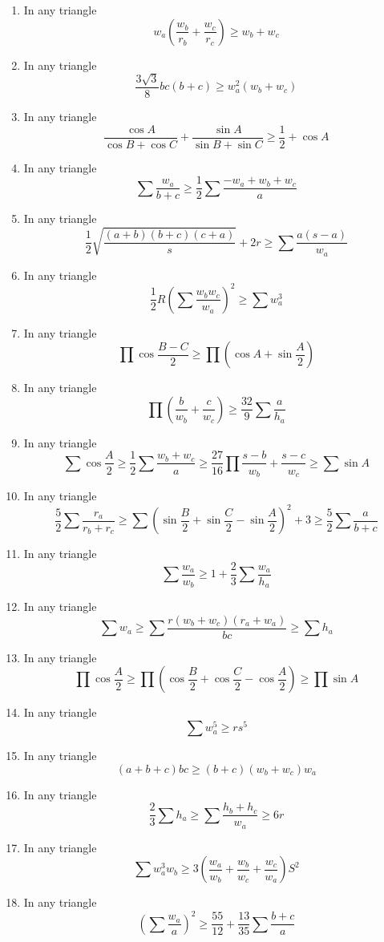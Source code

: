 \documentclass{report}
\begin{document}
\begin{enumerate}
	\item In any triangle$$w_a\left( \frac {w_b}{r_b} + \frac {w_c}{r_c}\right)\geq w_b + w_c$$
	\item In any triangle$$\frac{3\sqrt{3}}{8}bc(b+c)\geq w_a^2(w_b+w_c)$$
	\item In any triangle$$\frac {\cos{A}}{\cos{B} + \cos{C}} + \frac {\sin{A}}{\sin{B} + \sin{C}}\geq \frac {1}{2} + \cos{A}$$
	\item In any triangle$$\sum\frac{w_a}{b+c}\geq \frac{1}{2}\sum\frac{-w_a+w_b+w_c}{a}$$
	\item In any triangle$$\frac{1}{2}\sqrt {\frac {(a + b)(b + c)(c + a)}{s}} + 2r \geq \sum{\frac {a(s - a)}{w_a}}$$
	\item In any triangle$$\frac {1}{2}R\left( \sum\frac {w_bw_c}{w_a}\right) ^2\geq\sum{w_a^3}$$
	\item In any triangle$$\prod\cos\frac {B - C}{2}\geq \prod{\left( \cos{A} + \sin\frac {A}{2}\right) }$$
	\item In any triangle$$\prod{\left( \frac {b}{w_b} + \frac {c}{w_c}\right) }\geq \frac {32}{9}\sum\frac {a}{h_a}$$
	\item In any triangle$$\sum\cos\frac {A}{2}\geq \frac {1}{2}\sum\frac {w_b + w_c}{a}\geq \frac {27}{16}\prod{\frac {s - b}{w_b} + \frac {s - c}{w_c}}\geq\sum\sin{A}$$
	\item In any triangle$$ \frac {5}{2}\sum\frac {r_a}{r_b + r_c}\geq \sum{(\sin\frac {B}{2} + \sin\frac {C}{2} - \sin\frac {A}{2})^2} + 3\geq\frac {5}{2}\sum\frac {a}{b + c}$$
	\item In any triangle$$\sum\frac {w_a}{w_b}\geq 1 + \frac {2}{3}\sum\frac {w_a}{h_a}$$
	\item In any triangle$$\sum{w_a}\geq\sum\frac {r(w_b + w_c)(r_a + w_a)}{bc}\geq\sum{h_a}$$
	\item In any triangle$$\prod\cos\frac {A}{2}\geq \prod{\left( \cos\frac {B}{2} + \cos\frac {C}{2} - \cos\frac {A}{2}\right) }\geq\prod{\sin{A}}$$
	\item In any triangle$$\sum{w_a^5}\geq rs^5$$
	\item In any triangle$$(a + b + c)bc\geq (b + c)(w_b + w_c)w_a$$
	\item In any triangle$$\frac {2}{3}\sum{h_a}\geq\sum\frac {h_b + h_c}{w_a}\geq6r$$
	\item In any triangle$$ \sum{w_a^3w_b}\geq3(\frac {w_a}{w_b} + \frac {w_b}{w_c} + \frac {w_c}{w_a})S^2$$
	\item In any triangle$$ \left( \sum\frac {w_a}{a}\right) ^2\geq\frac {55}{12} + \frac {13}{35}\sum \frac {b + c}{a}$$

\end{enumerate}
\end{document}
